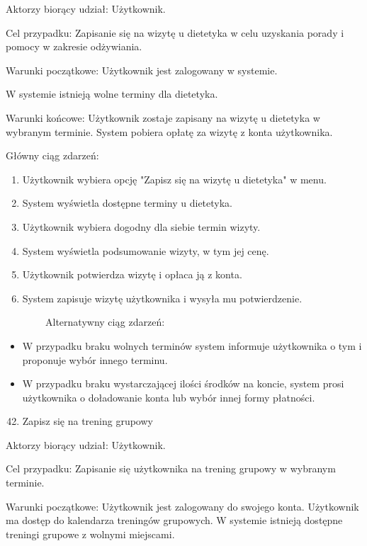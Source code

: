 {Aktorzy biorący udział: Użytkownik.}

{Cel przypadku: Zapisanie się na wizytę u dietetyka w celu uzyskania
porady i pomocy w zakresie odżywiania.}

{Warunki początkowe: Użytkownik jest zalogowany w systemie.}

{W systemie istnieją wolne terminy dla dietetyka.}

{Warunki końcowe: Użytkownik zostaje zapisany na wizytę u dietetyka w
wybranym terminie. System pobiera opłatę za wizytę z konta użytkownika.}

{Główny ciąg zdarzeń:}

\begin{enumerate}
\tightlist
\item
  {Użytkownik wybiera opcję "Zapisz się na wizytę u dietetyka" w menu.}
\item
  {System wyświetla dostępne terminy u dietetyka.}
\item
  {Użytkownik wybiera dogodny dla siebie termin wizyty.}
\item
  {System wyświetla podsumowanie wizyty, w tym jej cenę.}
\item
  {Użytkownik potwierdza wizytę i opłaca ją z konta.}
\item
  {System zapisuje wizytę użytkownika i wysyła mu potwierdzenie.}
\end{enumerate}

{~~~~~~~~Alternatywny ciąg zdarzeń:}

\begin{itemize}
\tightlist
\item
  {W przypadku braku wolnych terminów system informuje użytkownika o tym
  i proponuje wybór innego terminu.}
\item
  {W przypadku braku wystarczającej ilości środków na koncie, system
  prosi użytkownika o doładowanie konta lub wybór innej formy
  płatności.}
\end{itemize}

{\hfill\break
}

\begin{enumerate}
\setcounter{enumi}{41}
\tightlist
\item
  {Zapisz się na trening grupowy}
\end{enumerate}

{Aktorzy biorący udział: Użytkownik.}

{Cel przypadku: Zapisanie się użytkownika na trening grupowy w wybranym
terminie.}

{Warunki początkowe: Użytkownik jest zalogowany do swojego konta.
Użytkownik ma dostęp do kalendarza treningów grupowych. W systemie
istnieją dostępne treningi grupowe z wolnymi miejscami.}

